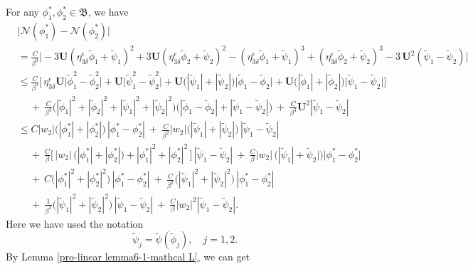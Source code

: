 \documentclass[10pt, reqno]{amsart}
\numberwithin{equation}{section}
\theoremstyle{definition}
\begin{document}
{{ For any $\phi_1^*, \phi_2^*\in \mathfrak B$, we have
\begin{align}\label{absolute vale N1-N2}
 &\Big|{\mathcal N}(\phi_1^*) - {\mathcal N}(\phi_2^*) \Big|
\nonumber\\[2mm]
 &= \frac{C}{\beta^3}
\Bigg|
 -3 \mathbf{U} \left(\eta_{3\delta}^{\epsilon}{\tilde\phi}_1 +{\tilde\psi}_1 \right)^2
 +3\mathbf{U} \left(\eta_{3\delta}^{\epsilon}{\tilde\phi}_2 +{\tilde\psi}_2 \right)^2
 -\left(\eta_{3\delta}^{\epsilon}{\tilde\phi}_1 +{\tilde\psi}_1 \right)^3
 +\left(\eta_{3\delta}^{\epsilon}{\tilde\phi}_2 +{\tilde\psi}_2 \right)^3
 -3\, \mathbf{U}^2 (\tilde\psi_1-\tilde\psi_2)
\Bigg|
\nonumber\\[2mm]
 & \leq \frac{C}{\beta^3}
\Bigg[\,
 \eta_{3\delta}^{\epsilon} \mathbf{U}\big|{\tilde\phi}_1^2- {\tilde\phi}_2^2\big|
 +\mathbf{U}\big|{\tilde\psi}_1^2- {\tilde\psi}_2^2\big|
 +\mathbf{U} \big(|\tilde{\psi}_1|+ |\tilde{\psi}_2|\big) \big|{\tilde\phi}_1- {\tilde\phi}_2\big|
 +\mathbf{U} \big(|\tilde{\phi}_1|+ |\tilde{\phi}_2|\big) \big|{\tilde\psi}_1- {\tilde\psi}_2\big|
\Bigg]
\nonumber\\[2mm]
 & \quad
 \ +\ \frac{C}{\beta^3} \big(|\tilde{\phi}_1|^2+ |\tilde{\phi}_2|^2 + |\tilde{\psi}_1|^2+ |\tilde{\psi}_2|^2 \big)
 \big( |\tilde{\phi}_1-\tilde{\phi}_2| +|\tilde{\psi}_1-\tilde{\psi}_2| \big) \ +\ \frac{C}{\beta^3} \mathbf{U}^2 |\tilde\psi_1-\tilde\psi_2|
\nonumber\\[2mm]
& \leq
 C |w_2|\big(|{\phi}_1^*|+| {\phi}_2^*|\big) \, |\phi^*_1-\phi^*_2|
\ +\
\frac{C}{\beta^2} |w_2| \big(|{\tilde\psi}_1|+| {\tilde\psi}_2|\big) \, |\tilde\psi_1-\tilde\psi_2|
\nonumber\\[2mm]
&\quad
 \ +\ \frac{C} {\beta}
\Big[\, |w_2|\, \big(|{\phi}_1^*|+| {\phi}_2^*|\big) + |{\phi}_1^*|^2+| {\phi}_2^*|^2\,\Big] \,|\tilde\psi_1-\tilde\psi_2|
\ +\ \frac{C} {\beta} |w_2|\,\big(|\tilde\psi_1|+\tilde\psi_2| \big) |{\phi}_1^*- {\phi}_2^*|
\nonumber\\[2mm]
 &\quad
 \ +\ C \big(|{\phi}_1^*|^2+| {\phi}_2^*|^2\big) \, |\phi^*_1-\phi^*_2|
 \ +\ \frac{C}{\beta^2} \big(|{\tilde\psi}_1|^2+| {\tilde\psi}_2|^2\big) \, |\phi^*_1-\phi^*_2|
\nonumber\\[2mm]
 &\quad
 \ +\ \frac{1}{\beta^3} \big(|{\tilde\psi}_1|^2+| {\tilde\psi}_2|^2\big)\,|\tilde\psi_1-\tilde\psi_2| \ +\ \frac{C}{\beta}| w_2|^2 |\tilde\psi_1-\tilde\psi_2|.
\end{align}
 Here we have used the notation
\[ \tilde{\psi}_j = {\tilde\psi}({ \tilde \phi}_j),\quad j =1,2.\]
 By Lemma \ref{pro-linear lemma6-1-mathcal L}, we can get
}}
\end{document}
